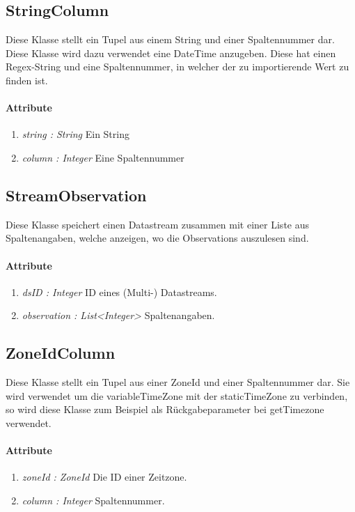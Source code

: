 \subsection{StringColumn}
Diese Klasse stellt ein Tupel aus einem String und einer Spaltennummer dar.
Diese Klasse wird dazu verwendet eine DateTime anzugeben. Diese hat einen Regex-String und eine Spaltennummer, in welcher der zu importierende Wert zu finden ist.
\paragraph{Attribute}
\begin{enumerate}[-]
	\item \textit{string : String} Ein String
	\item \textit{column : Integer} Eine Spaltennummer
\end{enumerate} 

\subsection{StreamObservation}
Diese Klasse speichert einen Datastream zusammen mit einer Liste aus Spaltenangaben, welche anzeigen, wo die Observations auszulesen sind.
\paragraph{Attribute} 
\begin{enumerate}[-]
	\item \textit{dsID : Integer} ID eines (Multi-) Datastreams. 
	\item \textit{observation : List<Integer>} Spaltenangaben.
\end{enumerate}

\subsection{ZoneIdColumn}
Diese Klasse stellt ein Tupel aus einer ZoneId und einer Spaltennummer dar.
Sie wird verwendet um die variableTimeZone mit der staticTimeZone zu verbinden, so wird diese Klasse zum Beispiel als Rückgabeparameter bei getTimezone verwendet.

\paragraph{Attribute}
\begin{enumerate}[-]
	\item \textit{zoneId : ZoneId} Die ID einer Zeitzone.
	\item \textit{column : Integer} Spaltennummer.
\end{enumerate}

